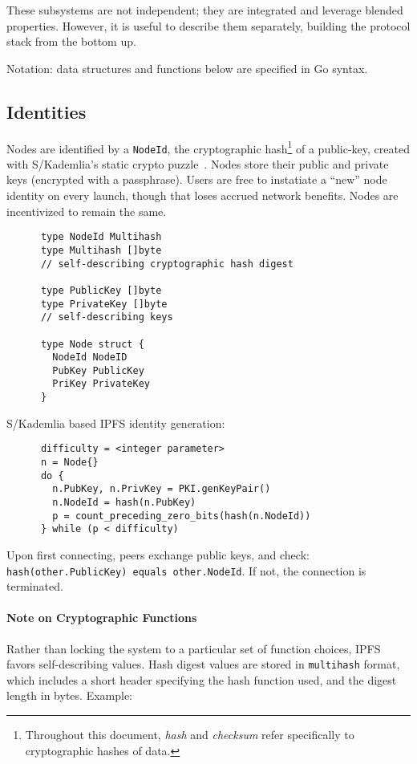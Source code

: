 \documentclass{sig-alternate}
\begin{document}
These subsystems are not independent; they are integrated and leverage
blended properties. However, it is useful to describe them separately,
building the protocol stack from the bottom up.

Notation: data structures and functions below are specified in Go syntax.

\subsection{Identities}

Nodes are identified by a \texttt{NodeId}, the cryptographic hash\footnote{Throughout this document, \textit{hash} and \textit{checksum} refer specifically to cryptographic hashes of data.} of a public-key, created with S/Kademlia's static crypto puzzle~\cite{baumgart07}. Nodes store their public and private keys (encrypted with a passphrase). Users are free to instatiate a ``new'' node identity on every launch, though that loses accrued network benefits. Nodes are incentivized to remain the same.

\begin{verbatim}
      type NodeId Multihash
      type Multihash []byte
      // self-describing cryptographic hash digest

      type PublicKey []byte
      type PrivateKey []byte
      // self-describing keys

      type Node struct {
        NodeId NodeID
        PubKey PublicKey
        PriKey PrivateKey
      }
\end{verbatim}

S/Kademlia based IPFS identity generation:

\begin{verbatim}
      difficulty = <integer parameter>
      n = Node{}
      do {
        n.PubKey, n.PrivKey = PKI.genKeyPair()
        n.NodeId = hash(n.PubKey)
        p = count_preceding_zero_bits(hash(n.NodeId))
      } while (p < difficulty)
\end{verbatim}


Upon first connecting, peers exchange public keys, and check: \texttt{hash(other.PublicKey) equals other.NodeId}. If not, the connection is terminated.

\paragraph{Note on Cryptographic Functions} Rather than locking the system to a particular set of function choices, IPFS favors self-describing values. Hash digest values are stored in \texttt{multihash} format, which includes a short header specifying the hash function used, and the digest length in bytes. Example:
\end{document}
